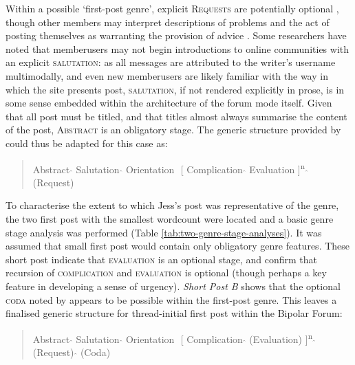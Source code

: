 \documentclass{article}
\renewcommand{\cite}{\parencite}
\begin{document}
%
Within a possible `first-post genre', explicit \textsc{Requests} are potentially optional \cite{vayreda_social_2009}, though other members may interpret descriptions of problems and the act of posting themselves as warranting the provision of advice \cite{goldsmith2000soliciting}. Some researchers \cite[e.g. ][]{herring_two_1996,weber_missed_2011} have noted that member{users} may not begin introductions to online communities with an explicit \textsc{salutation}: as all messages are attributed to the writer's username multimodally, and even new member{users} are likely familiar with the way in which the site presents post, \textsc{salutation}, if not rendered explicitly in prose, is in some sense embedded within the architecture of the forum mode itself. Given that all post must be titled, and that titles almost always summarise the content of the post, \textsc{Abstract} is an obligatory stage. The generic structure provided by \textcite{labov_narrative_1997} could thus be adapted for this case as:

\begin{quotation}\small
\noindent Abstract $\hat{}$ Salutation $\hat{}$ Orientation $\hat{}$ [ Complication $\hat{}$ Evaluation ]\textsuperscript{n} $\hat{}$ (Request)
\end{quotation}
%
To characterise the extent to which Jess's post was representative of the genre, the two first post with the smallest wordcount were located and a basic genre stage analysis was performed (Table \ref{tab:two-genre-stage-analyses}). It was assumed that small first post would contain only obligatory genre features. These short post indicate that \textsc{evaluation} is an optional stage, and confirm that recursion of \textsc{complication} and \textsc{evaluation} is optional (though perhaps a key feature in developing a sense of urgency). \emph{Short Post B} shows that the optional \textsc{coda} noted by \textcite{labov_narrative_1997} appears to be possible within the first-post genre. This leaves a finalised generic structure for thread-initial first post within the Bipolar Forum:

\begin{quotation}\small
\noindent Abstract $\hat{}$ Salutation $\hat{}$ Orientation $\hat{}$ [ Complication $\hat{}$ (Evaluation) ]\textsuperscript{n} $\hat{}$ (Request) $\hat{}$ (Coda)
\end{quotation}
\end{document}
